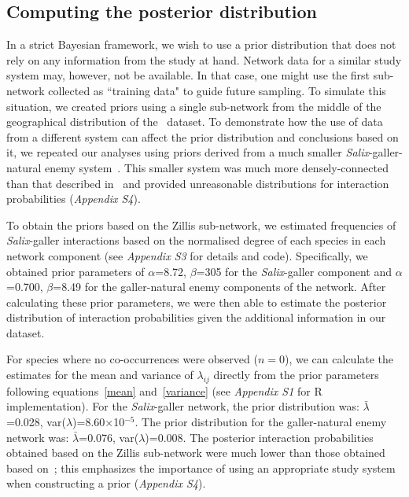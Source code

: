 \documentclass[12pt]{article}
\begin{document}
\begin{spacing}{2.0}


  \subsection*{Computing the posterior distribution}

      In a strict Bayesian framework, we wish to use a prior distribution that does not rely on any information from the study at hand. Network data for a similar study system may, however, not be available. In that case, one might use the first sub-network collected as ``training data" to guide future sampling. To simulate this situation, we created priors using a single sub-network from the middle of the geographical distribution of the~\citet{Kopelke2017} dataset. To demonstrate how the use of data from a different system can affect the prior distribution and conclusions based on it, we repeated our analyses using priors derived from a much smaller \emph{Salix}-galler-natural enemy system~\citep{Barbour2016,Barbour2016Dryad}. This smaller system was much more densely-connected than that described in~\citet{Kopelke2017} and provided unreasonable distributions for interaction probabilities (\emph{Appendix S4}). 


      To obtain the priors based on the Zillis sub-network, we estimated frequencies of \emph{Salix}-galler interactions based on the normalised degree of each species in each network component (see \emph{Appendix S3} for details and code). Specifically, we obtained prior parameters of $\alpha$=8.72, $\beta$=305 for the \emph{Salix}-galler component and $\alpha$=0.700, $\beta$=8.49 for the galler-natural enemy components of the network. After calculating these prior parameters, we were then able to estimate the posterior distribution of interaction probabilities given the additional information in our dataset.
  

      For species where no co-occurrences were observed ($n=0$), we can calculate the estimates for the mean and variance of $\lambda_{ij}$ directly from the prior parameters following equations~\ref{mean} and~\ref{variance} (see \emph{Appendix S1} for R implementation). For the \emph{Salix}-galler network, the prior distribution  was: $\bar\lambda$=0.028, var($\lambda$)=8.60$\times$10$^{-5}$. The prior distribution for the galler-natural enemy network was: $\bar\lambda$=0.076, var($\lambda$)=0.008. The posterior interaction probabilities obtained based on the Zillis sub-network were much lower than those obtained based on~\citet{Barbour2016}; this emphasizes the importance of using an appropriate study system when constructing a prior (\emph{Appendix S4}).



\end{spacing}
\end{document}
